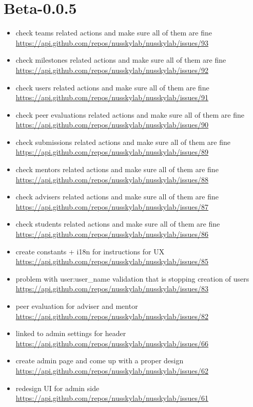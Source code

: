 {\section{Beta-0.0.5}
\begin{itemize}[noitemsep]
    \item check teams related actions and make sure all of them are fine \url{https://api.github.com/repos/nusskylab/nusskylab/issues/93} 
    \item check milestones related actions and make sure all of them are fine \url{https://api.github.com/repos/nusskylab/nusskylab/issues/92} 
    \item check users related actions and make sure all of them are fine \url{https://api.github.com/repos/nusskylab/nusskylab/issues/91} 
    \item check peer evaluations related actions and make sure all of them are fine \url{https://api.github.com/repos/nusskylab/nusskylab/issues/90} 
    \item check submissions related actions and make sure all of them are fine \url{https://api.github.com/repos/nusskylab/nusskylab/issues/89} 
    \item check mentors related actions and make sure all of them are fine \url{https://api.github.com/repos/nusskylab/nusskylab/issues/88} 
    \item check advisers related actions and make sure all of them are fine \url{https://api.github.com/repos/nusskylab/nusskylab/issues/87} 
    \item check students related actions and make sure all of them are fine \url{https://api.github.com/repos/nusskylab/nusskylab/issues/86} 
    \item create constants + i18n for instructions for UX \url{https://api.github.com/repos/nusskylab/nusskylab/issues/85} 
    \item problem with user:user\_name validation that is stopping creation of users \url{https://api.github.com/repos/nusskylab/nusskylab/issues/83} 
    \item peer evaluation for adviser and mentor \url{https://api.github.com/repos/nusskylab/nusskylab/issues/82} 
    \item linked to admin settings for header \url{https://api.github.com/repos/nusskylab/nusskylab/issues/66} 
    \item create admin page and come up with a proper design \url{https://api.github.com/repos/nusskylab/nusskylab/issues/62} 
    \item redesign UI for admin side \url{https://api.github.com/repos/nusskylab/nusskylab/issues/61} 

\end{itemize}}
